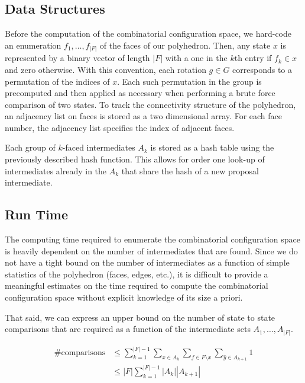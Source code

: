 \subsection{Data Structures}

Before the computation of the combinatorial configuration space, we hard-code an enumeration $f_1, \dots, f_{|F|}$ of the faces of our polyhedron. Then, any state $x$ is represented by a binary vector of length $|F|$ with a one in the $k$th entry if $f_k \in x$ and zero otherwise. With this convention, each rotation $g \in G$ corresponds to a permutation of the indices of $x$. Each such permutation in the group is precomputed and then applied as necessary when performing a brute force comparison of two states. To track the connectivity structure of the polyhedron, an adjacency list on faces is stored as a two dimensional array. For each face number, the adjacency list specifies the index of adjacent faces.

Each group of $k$-faced intermediates $A_k$ is stored as a hash table using the previously described hash function. This allows for order one look-up of intermediates already in the $A_k$ that share the hash of a new proposal intermediate. 

\subsection{Run Time}

The computing time required to enumerate the combinatorial configuration space is heavily dependent on the number of intermediates that are found. Since we do not have a tight bound on the number of intermediates as a function of simple statistics of the polyhedron (faces, edges, etc.), it is difficult to provide a meaningful estimates on the time required to compute the combinatorial configuration space without explicit knowledge of its size a priori.

That said, we can express an upper bound on the number of state to state comparisons that are required as a function of the intermediate sets $A_1,\dots,A_{|F|}$. 

\begin{align}
\#\text{comparisons} &\leq \sum_{k=1}^{|F|-1} \sum_{x \in A_k} \sum_{f \in F\setminus x} \sum_{\hat{y} \in A_{k+1}} 1 \\
&\leq |F|\sum_{k=1}^{|F|-1}|A_k||A_{k+1}| 
\end{align}


